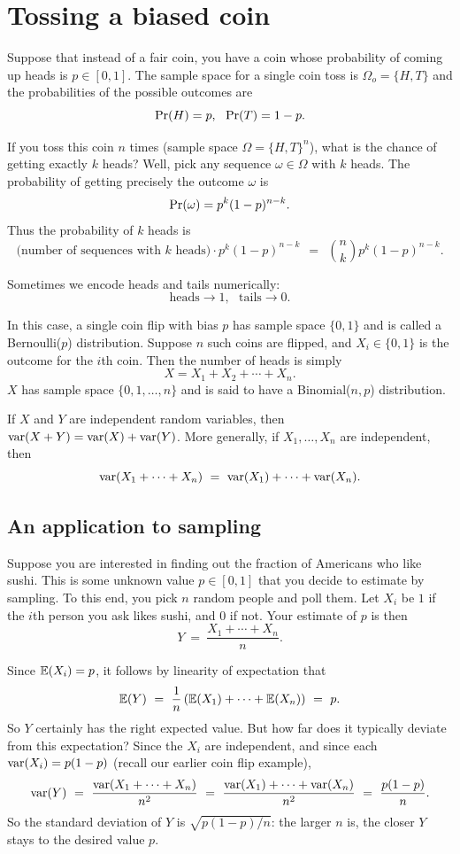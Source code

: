 \section{Tossing a biased coin}

Suppose that instead of a fair coin, you have a coin whose probability of coming up heads is $p \in [0,1]$. The sample space for a single coin toss is $\Omega_o = \{H,T\}$ and the probabilities of the possible outcomes are
$$ \mbox{\rm Pr}(H) = p, \ \ \mbox{\rm Pr}(T) = 1-p.$$

If you toss this coin $n$ times (sample space $\Omega = \{H,T\}^n$), what is the chance of getting exactly $k$ heads? Well, pick any sequence $\omega \in \Omega$ with $k$ heads. The probability of getting precisely the outcome $\omega$ is
$$ \mbox{\rm Pr}(\omega) = p^k (1-p)^{n-k} .$$
Thus the probability of $k$ heads is
$$ \mbox{(number of sequences with $k$ heads)} \cdot p^k (1-p)^{n-k} 
\ \ = \ \ 
{n \choose k} p^k (1-p)^{n-k} .$$

Sometimes we encode heads and tails numerically:
$$ \mbox{heads} \rightarrow 1, \ \ \ \mbox{tails} \rightarrow 0 .$$

In this case, a single coin flip with bias $p$ has sample space $\{0,1\}$ and is called a Bernoulli($p$) distribution. Suppose $n$ such coins are flipped, and $X_i \in \{0,1\}$ is the outcome for the $i$th coin. Then the number of heads is simply 
$$ X = X_1 + X_2 + \cdots + X_n. $$
$X$ has sample space $\{0,1,\ldots,n\}$ and is said to have a Binomial($n,p$) distribution.

If $X$ and $Y$ are independent random variables, then $\mbox{\rm var}(X+Y) = \mbox{\rm var}(X) + \mbox{\rm var}(Y)$.
More generally, if $X_1, \ldots, X_n$ are independent, then
$$ \var(X_1 + \cdots + X_n)
\ = \ 
\var(X_1) + \cdots + \var(X_n).
$$

\subsection{An application to sampling}

Suppose you are interested in finding out the fraction of Americans who like sushi. 
This is some unknown value $p \in [0,1]$ that you decide to estimate by sampling.
To this end, you pick $n$ random people and poll them. Let $X_i$ be $1$ if the $i$th
person you ask likes sushi, and $0$ if not. Your estimate of $p$ is then
$$ Y \ = \ \frac{X_1 + \cdots + X_n}{n}.$$

Since $\mathbb{E}(X_i) = p$, it follows by linearity of expectation that
$$
\E(Y)
\ = \ 
\frac{1}{n} \left( \E(X_1) + \cdots + \E(X_n) \right)
\ = \ 
p.
$$
So $Y$ certainly has the right expected value. But how far does it typically
deviate from this expectation? Since the $X_i$ are independent, and since
each $\mbox{\rm var}(X_i) = p(1-p)$ (recall our earlier coin flip example), 
$$ 
\var(Y) 
\ = \ 
\frac{\var(X_1 + \cdots + X_n)}{n^2}
\ = \ 
\frac{\var(X_1) + \cdots + \var(X_n)}{n^2}  
\ = \ 
\frac{p(1-p)}{n}.
$$
So the standard deviation of $Y$ is $\sqrt{p(1-p)/n}$: the larger $n$ is,
the closer $Y$ stays to the desired value $p$.

